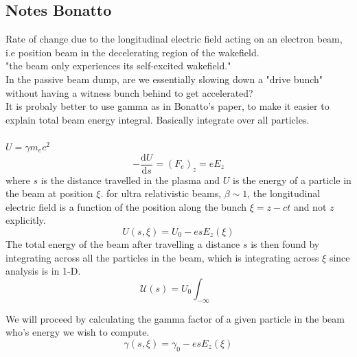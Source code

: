 \subsection{Notes Bonatto}
Rate of change due to the longitudinal electric field acting on an electron beam, i.e position beam in the decelerating region of the wakefield.\\
"the beam only experiences its self-excited wakefield."\\
In the passive beam dump, are we essentially slowing down a "drive bunch" without having a witness bunch behind to get accelerated?\\
It is probaly better to use gamma as in Bonatto's paper, to make it easier to explain total beam energy integral. Basically integrate over all particles.\\
\\
$U=\gamma m_ec^2$
\begin{equation}
-\frac{\mathrm{d}U}{\mathrm{d}s}=(F_e)_z=eE_z
\end{equation}
where $s$ is the distance travelled in the plasma and $U$ is the energy of a particle in the beam at position $\xi$. 
for ultra relativistic beams, $\beta\sim 1$, the longitudinal electric field is a function of the position along the bunch $\xi=z-ct$ and not $z$ explicitly. 
\begin{equation}
U(s,\xi)=U_0-esE_z(\xi)
\end{equation}
The total energy of the beam after travelling a distance $s$ is then found by integrating across all the particles in the beam, which is integrating across $\xi$ since analysis is in 1-D.
\begin{equation}
\mathcal{U}(s)=U_0\int_{-\infty}
\end{equation}

We will proceed by calculating the gamma factor of a given particle in the beam who's energy we wish to compute.
\begin{equation}
\gamma(s,\xi)=\gamma_0-esE_z(\xi)
\end{equation}